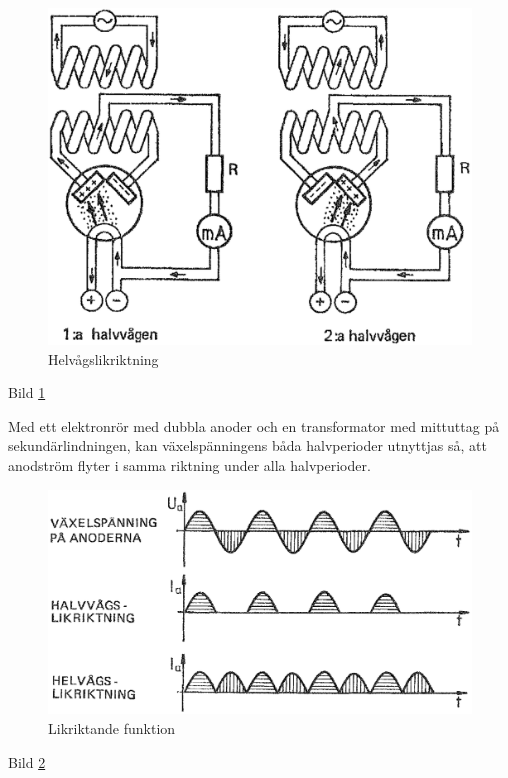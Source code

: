 \begin{figure}
\includegraphics[width=\textwidth]{images/cropped_pdfs/bild_2_2-28.pdf}
\caption{Helvågslikriktning}
\label{fig:BildII2-28}
\end{figure}

Bild \ref{fig:BildII2-28}

Med ett elektronrör med dubbla anoder och en transformator med mittuttag på
sekundärlindningen, kan växelspänningens båda halvperioder utnyttjas så, att
anodström flyter i samma riktning under alla halvperioder.

\begin{figure}
\includegraphics[width=\textwidth]{images/cropped_pdfs/bild_2_2-29.pdf}
\caption{Likriktande funktion}
\label{fig:BildII2-29}
\end{figure}

Bild \ref{fig:BildII2-29}

